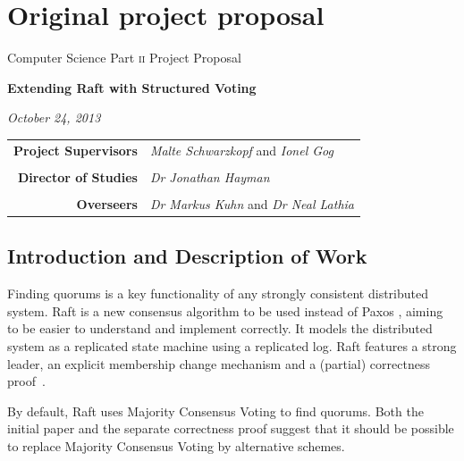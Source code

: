 \documentclass[12pt,chapterprefix=true,toc=bibliography,numbers=noendperiod,
               footnotes=multiple,twoside]{scrreprt}
\begin{document}
\chapter{Original project proposal}
\label{ch:original-proposal}




\vfil

\centerline{\large Computer Science Part \textsc{ii} Project Proposal} \vspace{0.4in}
\centerline{\Large\textbf{Extending Raft with Structured Voting}} \vspace{0.3in}
\centerline{\large\textit{October 24, 2013}}

\vfil

\begin{center}
\begin{tabularx}{316pt}{rX}
\textbf{Project Supervisors} & \textit{Malte Schwarzkopf} and \textit{Ionel Gog} \\ \\
\textbf{Director of Studies} & \textit{Dr Jonathan Hayman} \\ \\
\textbf{Overseers} & \textit{Dr Markus Kuhn} and \textit{Dr Neal Lathia}
\end{tabularx}
\end{center}

\section*{Introduction and Description of Work%
  \label{introduction-and-description-of-work}%
}

Finding quorums is a key functionality of any strongly consistent distributed system. Raft \autocite{raft} is a new consensus algorithm to be used instead of Paxos \autocite{paxos}, aiming to be easier to understand and implement correctly. It models the distributed system as a replicated state machine using a replicated log. Raft features a strong leader, an explicit membership change mechanism and a (partial) correctness proof~\autocite{raftproof}.

By default, Raft uses Majority Consensus Voting to find quorums. Both the initial paper and the separate correctness proof suggest that it should be possible to replace Majority Consensus Voting by alternative schemes.
\end{document}
